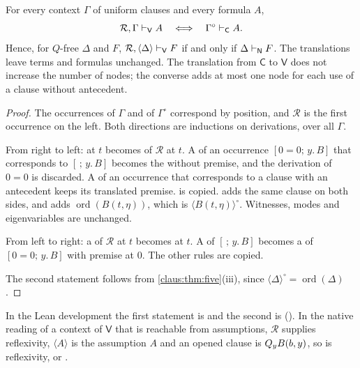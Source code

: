 \begin{theorem}
\label{claus:thm:uniform}
For every context $\Gamma$ of uniform clauses and every formula $A$,
\[
 \mathcal{R},\Gamma\vdash_{\mathsf{V}}A\quad\Longleftrightarrow\quad
 \Gamma^{\circ}\vdash_{\mathsf{C}}A .
\]
Hence, for $Q$-free $\Delta$ and $F$,
$\mathcal{R},\langle\Delta\rangle\vdash_{\mathsf{V}}F$ if and only if
$\Delta\vdash_{\mathsf{N}}F$. The translations leave terms and formulas
unchanged. The translation from $\mathsf{C}$ to $\mathsf{V}$ does not
increase the number of nodes; the converse adds at most one
 node for each use of a clause without antecedent.
\end{theorem}
\begin{proof}
The occurrences of $\Gamma$ and of $\Gamma^{\circ}$ correspond by
position, and $\mathcal{R}$ is the first occurrence on the left. Both
directions are inductions on derivations, over all $\Gamma$.

From right to left:  at $t$ becomes  of
$\mathcal{R}$ at $t$. A  of an occurrence $[0=0;\,y.\,B]$ that
corresponds to $[\,;\,y.\,B]$ becomes the  without premise,
and the derivation of $0=0$ is discarded. A  of an occurrence
that corresponds to a clause with an antecedent keeps its translated
premise.  is copied.  adds the same clause on
both sides, and  adds $\operatorname{ord}(B(t,\eta))$,
which is $\langle B(t,\eta)\rangle^{\circ}$. Witnesses, modes and
eigenvariables are unchanged.

From left to right: a  of $\mathcal{R}$ at $t$ becomes
 at $t$. A  of $[\,;\,y.\,B]$ becomes a
 of $[0=0;\,y.\,B]$ with premise  at $0$. The
other rules are copied.

The second statement follows from \cref{claus:thm:five}(iii), since
$\langle\Delta\rangle^{\circ}=\operatorname{ord}(\Delta)$.
\end{proof}

\begin{remark}
\label{claus:rem:uniformpkgs}
In the Lean development the first statement is  and
the second is 
(). In the native reading of a context of
$\mathsf{V}$ that is reachable from assumptions, $\mathcal{R}$ supplies
reflexivity, $\langle A\rangle$ is the assumption $A$ and an opened clause
is $Q_{y}B(b,y)$, so  is reflexivity,  or .
\end{remark}

